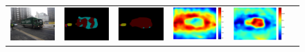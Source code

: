 \documentclass[10pt,twocolumn,letterpaper]{article}
\begin{document}
\begin{figure}
\begin{tabular}{c c c c c c}
   \includegraphics[height=0.1\linewidth]{fig/coco/img/COCO_val2014_000000001799.jpg} &
   \includegraphics[height=0.1\linewidth]{fig/coco/res_baseline/COCO_val2014_000000001799.png} &
   \includegraphics[height=0.1\linewidth]{fig/coco/res_sharenet/COCO_val2014_000000001799.png} &
   \includegraphics[height=0.1\linewidth]{fig/coco/att1/COCO_val2014_000000001799.pdf} &
   \includegraphics[height=0.1\linewidth]{fig/coco/att2/COCO_val2014_000000001799.pdf} &

\end{tabular}
\end{figure}
\end{document}

